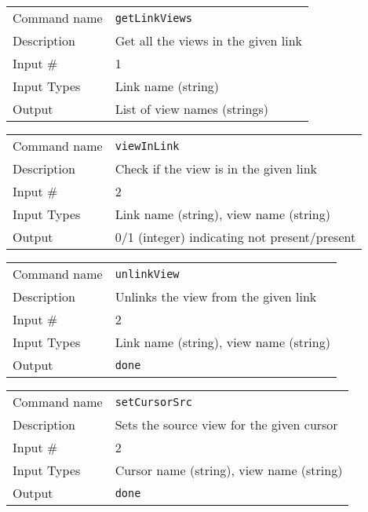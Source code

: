 \bigskip

\noindent
\begin{tabular}{l|p{5in}}
\hline
Command name & {\tt getLinkViews} \\
Description  & Get all the views in the given link \\
Input \#     & 1 \\
Input Types  & Link name (string) \\
Output       & List of view names (strings) \\
\hline
\end{tabular}

\bigskip

\noindent
\begin{tabular}{l|p{5in}}
\hline
Command name & {\tt viewInLink} \\
Description  & Check if the view is in the given link \\
Input \#     & 2 \\
Input Types  & Link name (string), view name (string) \\
Output       & 0/1 (integer) indicating not present/present \\
\hline
\end{tabular}

\bigskip

\noindent
\begin{tabular}{l|p{5in}}
\hline
Command name & {\tt unlinkView} \\
Description  & Unlinks the view from the given link \\
Input \#     & 2 \\
Input Types  & Link name (string), view name (string) \\
Output       & {\tt done} \\
\hline
\end{tabular}

\bigskip

\noindent
\begin{tabular}{l|p{5in}}
\hline
Command name & {\tt setCursorSrc} \\
Description  & Sets the source view for the given cursor \\
Input \#     & 2 \\
Input Types  & Cursor name (string), view name (string) \\
Output       & {\tt done} \\
\hline
\end{tabular}

\bigskip

